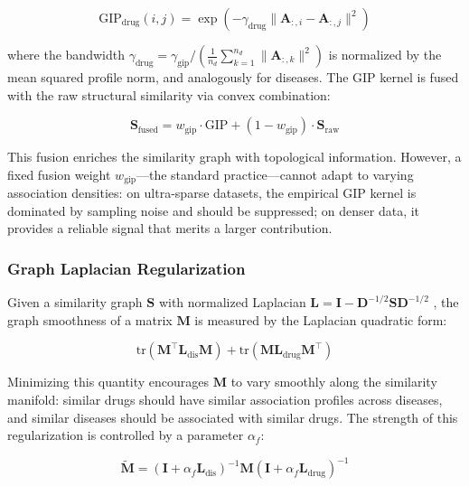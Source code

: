 \documentclass{oup-authoring-template}
\newcommand{\tr}{\mathrm{tr}}
\begin{document}
\begin{equation}
\text{GIP}_{\text{drug}}(i, j) = \exp\left(-\gamma_{\text{drug}} \|\mathbf{A}_{:,i} - \mathbf{A}_{:,j}\|^2\right)
\label{eq:gip}
\end{equation}

where the bandwidth $\gamma_{\text{drug}} = \gamma_{\text{gip}} / (\frac{1}{n_d}\sum_{k=1}^{n_d} \|\mathbf{A}_{:,k}\|^2)$ is normalized by the mean squared profile norm, and analogously for diseases. The GIP kernel is fused with the raw structural similarity via convex combination:

\begin{equation}
\mathbf{S}_{\text{fused}} = w_{\text{gip}} \cdot \text{GIP} + (1 - w_{\text{gip}}) \cdot \mathbf{S}_{\text{raw}}
\label{eq:fusion}
\end{equation}

This fusion enriches the similarity graph with topological information. However, a fixed fusion weight $w_{\text{gip}}$---the standard practice---cannot adapt to varying association densities: on ultra-sparse datasets, the empirical GIP kernel is dominated by sampling noise and should be suppressed; on denser data, it provides a reliable signal that merits a larger contribution.

\subsubsection{Graph Laplacian Regularization}

Given a similarity graph $\mathbf{S}$ with normalized Laplacian $\mathbf{L} = \mathbf{I} - \mathbf{D}^{-1/2} \mathbf{S} \mathbf{D}^{-1/2}$ \cite{chung1997}, the graph smoothness of a matrix $\mathbf{M}$ is measured by the Laplacian quadratic form:

\begin{equation}
\tr(\mathbf{M}^\top \mathbf{L}_{\text{dis}} \mathbf{M}) + \tr(\mathbf{M} \mathbf{L}_{\text{drug}} \mathbf{M}^\top)
\label{eq:smoothness}
\end{equation}

Minimizing this quantity encourages $\mathbf{M}$ to vary smoothly along the similarity manifold: similar drugs should have similar association profiles across diseases, and similar diseases should be associated with similar drugs. The strength of this regularization is controlled by a parameter $\alpha_f$:

\begin{equation}
\tilde{\mathbf{M}} = (\mathbf{I} + \alpha_f \mathbf{L}_{\text{dis}})^{-1} \mathbf{M} (\mathbf{I} + \alpha_f \mathbf{L}_{\text{drug}})^{-1}
\label{eq:gf}
\end{equation}
\end{document}
